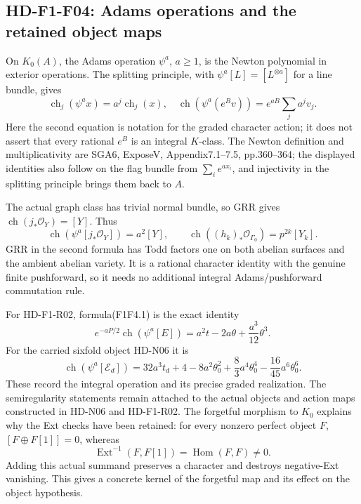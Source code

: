 \subsection{HD-F1-F04: Adams operations and the retained object maps}

On $K_0(A)$, the Adams operation $\psi^a$, $a\ge1$, is the
Newton polynomial in exterior operations. The splitting principle,
with $\psi^a[L]=[L^{\otimes a}]$ for a line bundle, gives
\[
 \operatorname{ch}_j(\psi^a x)=a^j\operatorname{ch}_j(x),
 \quad
 \operatorname{ch}(\psi^a(e^Bv))
       =e^{aB}\sum_j a^jv_j.
 \tag{F1F4.1}
\]
Here the second equation is notation for the graded character
action; it does not assert that every rational $e^B$ is an
integral $K$-class. The Newton definition and multiplicativity
are SGA6, ExposeV, Appendix7.1--7.5, pp.360--364;
the displayed identities also follow on the flag bundle from
$\sum_i e^{ax_i}$, and injectivity in the splitting principle
brings them back to $A$.

The actual graph class has trivial normal bundle, so GRR gives
$\operatorname{ch}(j_*\mathcal O_Y)=[Y]$. Thus
\[
 \operatorname{ch}(\psi^a[j_*\mathcal O_Y])=a^2[Y],
 \qquad
 \operatorname{ch}((h_k)_*\mathcal O_{\Gamma_0})
                    =p^{2k}[Y_k].
 \tag{F1F4.2}
\]
GRR in the second formula has Todd factors one on both abelian
surfaces and the ambient abelian variety. It is a rational
character identity with the genuine finite pushforward, so it
needs no additional integral Adams/pushforward commutation rule.

For HD-F1-R02, formula(F1F4.1) is the exact identity
\[
 e^{-aP/2}\operatorname{ch}(\psi^a[E])
       =a^2t-2a\theta+\frac{a^3}{12}\theta^3.
 \tag{F1F4.3}
\]
For the carried sixfold object HD-N06 it is
\[
 \operatorname{ch}(\psi^a[\mathcal E_d])
 =32a^3t_d+4-8a^2\theta_0^2
       +\frac83a^4\theta_0^4-\frac{16}{45}a^6\theta_0^6.
 \tag{F1F4.4}
\]
These record the integral operation and its precise graded
realization. The semiregularity statements remain attached to
the actual objects and action maps constructed in HD-N06 and
HD-F1-R02. The forgetful morphism to $K_0$ explains why the
Ext checks have been retained: for every nonzero perfect object
$F$, $[F\oplus F[1]]=0$, whereas
\[
 \operatorname{Ext}^{-1}(F,F[1])
          =\operatorname{Hom}(F,F)\ne0.
 \tag{F1F4.5}
\]
Adding this actual summand preserves a character and destroys
negative-Ext vanishing. This gives a concrete kernel of the
forgetful map and its effect on the object hypothesis.

